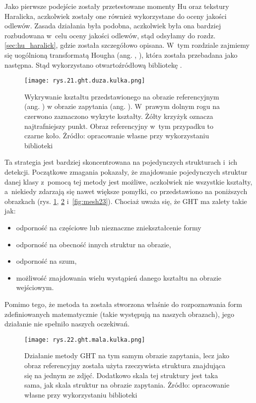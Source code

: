 Jako pierwsze podejście zostały przetestowane momenty Hu oraz tekstury Haralicka, aczkolwiek zostały one również wykorzystane do oceny jakości odlewów. Zasada działania była podobna, aczkolwiek była ona bardziej rozbudowana w~celu oceny jakości odlewów, stąd odsyłamy do rozdz. \ref{sec:hu_haralick}, gdzie została szczegółowo opisana. W~tym rozdziale zajmiemy się uogólnioną transformatą Hougha (ang. , ), która została przebadana jako następna. Stąd wykorzystano otwartoźródłową bibliotekę . 
\begin{figure}[h]
    \centering
    \texttt{[image: rys.21.ght.duza.kulka.png]}
    \caption{Wykrywanie kształtu przedstawionego na obrazie referencyjnym (ang. ) w obrazie zapytania (ang. ). W~prawym dolnym rogu na czerwono zaznaczono wykryte kształty. Żółty krzyżyk oznacza najtrafniejszy punkt. Obraz referencyjny w~tym przypadku to czarne koło. Żródło: opracowanie własne przy wykorzystaniu biblioteki }
    \label{fig:mesh21}
\end{figure}
Ta strategia jest bardziej skoncentrowana na pojedynczych strukturach i~ich detekcji. Początkowe zmagania pokazały, że znajdowanie pojedynczych struktur danej klasy z~pomocą tej metody jest możliwe, aczkolwiek nie wszystkie kształty, a~niekiedy zdarzają się nawet większe pomyłki, co przedstawiono na poniższych obrazkach (rys. \ref{fig:mesh21}, \ref{fig:mesh22} i~\ref{fig:mesh23}). Chociaż uważa się, że GHT ma zalety takie jak:
\begin{itemize}
	\item odporność na częściowe lub nieznaczne zniekształcenie formy
	\item odporność na obecność innych struktur na obrazie,
	\item odporność na szum,
	\item możliwość znajdowania wielu wystąpień danego kształtu na obrazie wejściowym.
\end{itemize}
Pomimo tego, że metoda ta została stworzona właśnie do rozpoznawania form zdefiniowanych matematycznie (takie występują na naszych obrazach), jego działanie nie spełniło naszych oczekiwań.
\begin{figure}[h]
    \centering
    \texttt{[image: rys.22.ght.mala.kulka.png]}
    \caption{Działanie metody GHT na tym samym obrazie zapytania, lecz jako obraz referencyjny została użyta rzeczywista struktura znajdująca się na jednym ze zdjęć. Dodatkowo skala tej struktury jest taka sama, jak skala struktur na obrazie zapytania. Żródło: opracowanie własne przy wykorzystaniu biblioteki }
    \label{fig:mesh22}
\end{figure}
